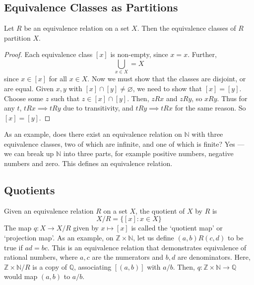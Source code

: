 \subsection{Equivalence Classes as Partitions}
\begin{proposition}
	Let \(R\) be an equivalence relation on a set \(X\).
	Then the equivalence classes of \(R\) partition \(X\).
\end{proposition}
\begin{proof}
	Each equivalence class \([x]\) is non-empty, since \(x = x\).
	Further,
	\[
		\bigcup_{x \in X} = X
	\]
	since \(x \in [x]\) for all \(x \in X\).
	Now we must show that the classes are disjoint, or are equal.
	Given \(x, y\) with \([x] \cap [y] \neq \varnothing\), we need to show that \([x] = [y]\).
	Choose some \(z\) such that \(z \in [x] \cap [y]\).
	Then, \(zRx\) and \(zRy\), so \(xRy\).
	Thus for any \(t\), \(tRx \implies tRy\) due to transitivity, and \(tRy \implies tRx\) for the same reason.
	So \([x] = [y]\).
\end{proof}
As an example, does there exist an equivalence relation on \(\mathbb N\) with three equivalence classes, two of which are infinite, and one of which is finite?
Yes --- we can break up \(\mathbb N\) into three parts, for example positive numbers, negative numbers and zero.
This defines an equivalence relation.

\subsection{Quotients}
Given an equivalence relation \(R\) on a set \(X\), the quotient of \(X\) by \(R\) is
\[
	X/R = \{ [x]: x \in X \}
\]
The map \(q\colon X\to X/R\) given by \(x \mapsto [x]\) is called the `quotient map' or `projection map'.
As an example, on \(\mathbb Z \times \mathbb N\), let us define \((a, b)R(c, d)\) to be true if \(ad=bc\).
This is an equivalence relation that demonstrates equivalence of rational numbers, where \(a, c\) are the numerators and \(b, d\) are denominators.
Here, \(\mathbb Z \times \mathbb N / R\) is a copy of \(\mathbb Q\), associating \([(a, b)]\) with \(a/b\).
Then, \(q\colon \mathbb Z \times \mathbb N \to \mathbb Q\) would map \((a, b)\) to \(a/b\).

